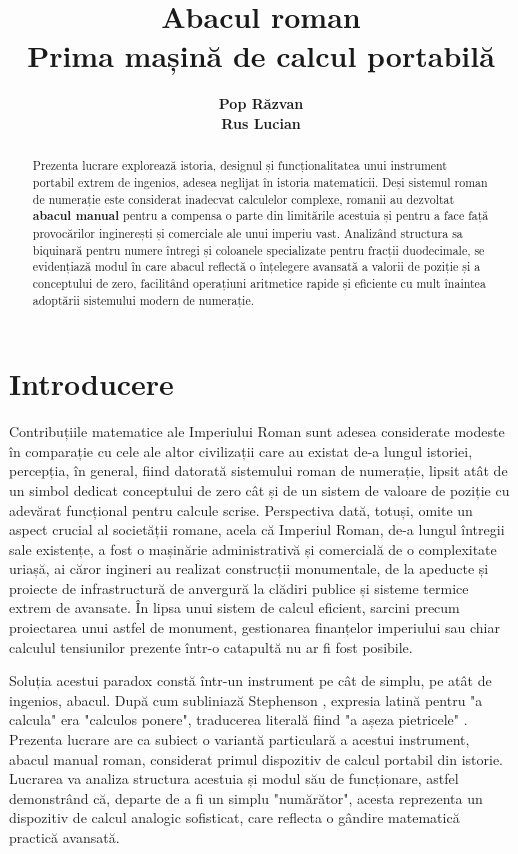 \documentclass[12pt, a4paper]{article}
\title{\textbf{Abacul roman \\
Prima mașină de calcul portabilă}}
\author{
  \textbf{Pop Răzvan} \\
  \textbf{Rus Lucian}
}
\date{}
\begin{document}
\maketitle

\begin{abstract}
Prezenta lucrare explorează istoria, designul și funcționalitatea unui instrument portabil extrem de ingenios, adesea neglijat în istoria matematicii. Deși sistemul roman de numerație este considerat inadecvat calculelor complexe, romanii au dezvoltat \textbf{abacul manual} pentru a compensa o parte din limitările acestuia și pentru a face față provocărilor inginerești și comerciale ale unui imperiu vast. Analizând structura sa biquinară pentru numere întregi și coloanele specializate pentru fracții duodecimale, se evidențiază modul în care abacul reflectă o înțelegere avansată a valorii de poziție și a conceptului de zero, facilitând operațiuni aritmetice rapide și eficiente cu mult înaintea adoptării sistemului modern de numerație.
\end{abstract}

\section*{Introducere}
\quad Contribuțiile matematice ale Imperiului Roman sunt adesea considerate modeste în comparație cu cele ale altor civilizații care au existat de-a lungul istoriei, percepția, în general, fiind datorată sistemului roman de numerație, lipsit atât de un simbol dedicat conceptului de zero cât și de un sistem de valoare de poziție cu adevărat funcțional pentru calcule scrise. Perspectiva dată, totuși, omite un aspect crucial al societății romane, acela că Imperiul Roman, de-a lungul întregii sale existențe, a fost o mașinărie administrativă și comercială de o complexitate uriașă, ai căror ingineri au realizat construcții monumentale, de la apeducte și proiecte de infrastructură de anvergură la clădiri publice și sisteme termice extrem de avansate. În lipsa unui sistem de calcul eficient, sarcini precum proiectarea unui astfel de monument, gestionarea finanțelor imperiului sau chiar calculul tensiunilor prezente într-o catapultă nu ar fi fost posibile.

Soluția acestui paradox constă într-un instrument pe cât de simplu, pe atât de ingenios, abacul. După cum subliniază Stephenson \cite{stephenson}, expresia latină pentru "a calcula" era "calculos ponere", traducerea literală fiind "a așeza pietricele" \cite{ethw}. Prezenta lucrare are ca subiect o variantă particulară a acestui instrument, abacul manual roman, considerat primul dispozitiv de calcul portabil din istorie. Lucrarea va analiza structura acestuia și modul său de funcționare, astfel demonstrând că, departe de a fi un simplu "numărător", acesta reprezenta un dispozitiv de calcul analogic sofisticat, care reflecta o gândire matematică practică avansată.
\end{document}
